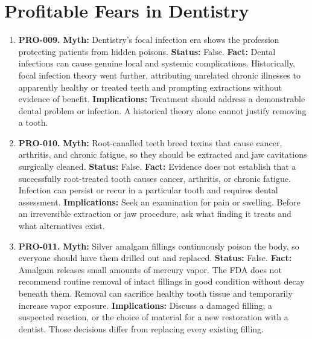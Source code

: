 \documentclass[11pt,oneside]{book}
\begin{document}
\section{Profitable Fears in Dentistry}
\begin{enumerate}[leftmargin=0pt,labelwidth=0pt,labelsep=0pt,itemindent=0pt]
\item[] \textbf{PRO-009.} \textbf{Myth:} Dentistry's focal infection era shows the profession protecting patients from hidden poisons.\newline
\textbf{Status:} False.\newline
\textbf{Fact:} Dental infections can cause genuine local and systemic complications. Historically, focal infection theory went further, attributing unrelated chronic illnesses to apparently healthy or treated teeth and prompting extractions without evidence of benefit. \cite{ref160}\newline
\textbf{Implications:} Treatment should address a demonstrable dental problem or infection. A historical theory alone cannot justify removing a tooth.
\item[] \textbf{PRO-010.} \textbf{Myth:} Root-canalled teeth breed toxins that cause cancer, arthritis, and chronic fatigue, so they should be extracted and jaw cavitations surgically cleaned.\newline
\textbf{Status:} False.\newline
\textbf{Fact:} Evidence does not establish that a successfully root-treated tooth causes cancer, arthritis, or chronic fatigue. Infection can persist or recur in a particular tooth and requires dental assessment. \cite{ref160}\newline
\textbf{Implications:} Seek an examination for pain or swelling. Before an irreversible extraction or jaw procedure, ask what finding it treats and what alternatives exist.
\item[] \textbf{PRO-011.} \textbf{Myth:} Silver amalgam fillings continuously poison the body, so everyone should have them drilled out and replaced.\newline
\textbf{Status:} False.\newline
\textbf{Fact:} Amalgam releases small amounts of mercury vapor. The FDA does not recommend routine removal of intact fillings in good condition without decay beneath them. Removal can sacrifice healthy tooth tissue and temporarily increase vapor exposure. \cite{ref491}\newline
\textbf{Implications:} Discuss a damaged filling, a suspected reaction, or the choice of material for a new restoration with a dentist. Those decisions differ from replacing every existing filling.
\end{enumerate}
\end{document}
